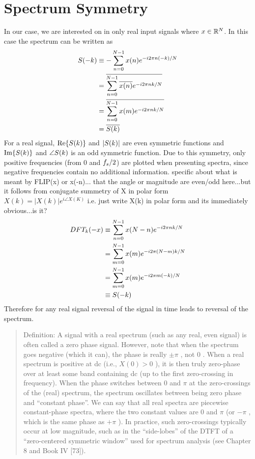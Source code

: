 \section{Spectrum Symmetry} In our case, we are interested on in only real input
signals where $x \in \mathbb{R}^N$. In this case the spectrum can be written as
\begin{align*} S(-k) &\equiv - \sum_{n=0}^{N-1} x(n) e^{-i2 \pi n ( -k ) / N} \\ &=
\overline{ \sum_{n=0}^{N-1} \overline{x(n)} e^{-i2 \pi n k / N}} \\ &= \overline{ \sum_{n=0}^{N-1} x(m)
e^{-i2 \pi n k / N}} \\ &= \overline{S(k)}
\end{align*} For a real signal, $\textrm{Re}\{S(k)\}$ and $|S(k)|$
are even symmetric functions and $\textrm{Im}\{S(k)\}$ and $\angle
S(k)$ is an odd symmetric function. Due to this symmetry, only positive
frequencies (from $0$ and $f_s/2$) are plotted when presenting spectra, since
negative frequencies contain no additional information. %
specific about what is meant by FLIP(x) or x(-n)... %
that the angle or magnitude are even/odd here...but it follows from conjugate
summetry of X in polar form $X(k) = |X(k)|e^{i \angle X(K)}$ i.e. just write X(k)
in polar form and its immediately obvious...is it?
\begin{align*} DFT_k(-x) &\equiv \sum_{n=0}^{N-1} x(N-n) e^{-i2 \pi n k / N} \\ &=
\sum_{m=0}^{N-1} x(m) e^{- i 2 \pi (N-m)k / N} \\ &= \sum_{m=0}^{N-1} x(m) e^{-
i 2 \pi m ( -k ) / N} \\ &\equiv S(-k)
\end{align*} Therefore for any real signal reversal of the signal in time leads
to reversal of the spectrum.
\begin{quote} Definition: A signal with a real spectrum (such as any real, even
signal) is often called a zero phase signal. However, note that when the
spectrum goes negative (which it can), the phase is really $ \pm\pi$ , not 0 .
When a real spectrum is positive at dc (i.e., $ X(0)>0$ ), it is then truly
zero-phase over at least some band containing dc (up to the first zero-crossing
in frequency). When the phase switches between 0 and $ \pi $ at the
zero-crossings of the (real) spectrum, the spectrum oscillates between being
zero phase and ``constant phase''. We can say that all real spectra are
piecewise constant-phase spectra, where the two constant values are 0 and $ \pi
$ (or $ -\pi$ , which is the same phase as $ +\pi$ ). In practice, such
zero-crossings typically occur at low magnitude, such as in the ``side-lobes''
of the DTFT of a ``zero-centered symmetric window'' used for spectrum analysis
(see Chapter 8 and Book IV [73]).
\end{quote}

